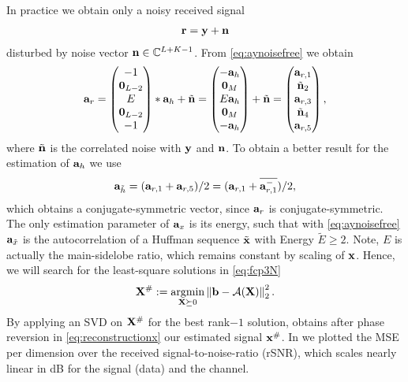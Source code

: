 \documentclass[conference]{IEEEtran}
\begin{document}
In practice we obtain only a noisy received signal 
%
\begin{align}
  {\ensuremath{\mathbf r}}={\mathbf y}+{\mathbf n}
\end{align}
%
disturbed by noise vector ${\mathbf n}\in{\ensuremath{\mathbb C}}^{L+K-1}$.  From \eqref{eq:aynoisefree} we obtain
%
\begin{align}
  {\ensuremath{\mathbf a}}_r=  \begin{pmatrix}
    -1 \\ {\mathbf 0}_{L-2} \\ E \\ {\mathbf 0}_{L-2}\\ -1\end{pmatrix} * {\mathbf a}_{h} + \tilde{\mathbf n}= \begin{pmatrix} -{\mathbf a}_h \\{\mathbf 0}_M \\ E
  {\mathbf a}_h  \\{\mathbf 0}_M\\
  -{\mathbf a}_{h} \end{pmatrix}+\tilde{\mathbf n}
= \begin{pmatrix}{\ensuremath{\mathbf a}}_{r,1} \\\tilde{\mathbf n}_2\\ {\mathbf a}_{r,3}\\ \tilde{\mathbf n}_4 \\  {\mathbf a}_{r,5}\end{pmatrix},\label{eq:aynoisy}
\end{align}
%
where $\tilde{\mathbf n}$ is the correlated noise with ${\mathbf y}$ and ${\mathbf n}$.
%
To obtain a better result for the estimation of ${\mathbf a}_h$ we use
%
\begin{align}
  {\ensuremath{\mathbf a}}_{\tilde{h}}=({\mathbf a}_{r,1}+{\mathbf a}_{r,5})/2=({\mathbf a}_{r,1}+{\overline{{\mathbf a}_{r,1}^-}})/2,\label{eq:average}
\end{align}
%
which obtains a conjugate-symmetric vector, since ${\mathbf a}_r$ is conjugate-symmetric. The only estimation parameter of
${\mathbf a}_x$ is its energy, such that with \eqref{eq:aynoisefree} ${\mathbf a}_{\tilde{x}}$ is the autocorrelation of a Huffman sequence
$\tilde{\mathbf x}$ with Energy $\tilde{E}\geq 2$. Note, $E$ is actually the main-sidelobe ratio, which remains constant by scaling
of ${\mathbf x}$.
Hence, we will search for the least-square solutions in \eqref{eq:fcp3N} 
%
\begin{align}
  \vX^{\#}:=\argmin_{\vX\mgeq 0} \Norm{\vb-\Alin(\vX)}_2^2.
\end{align}
%
By applying an SVD on ${\mathbf X}^{\#}$ for the best rank$-1$ solution, obtains after phase reversion in
\eqref{eq:reconstructionx} our estimated signal ${\mathbf x}^{\#}$.  In  we plotted the MSE per dimension
over the received signal-to-noise-ratio (rSNR), which scales nearly linear in dB for the signal (data) and the channel.
\end{document}
